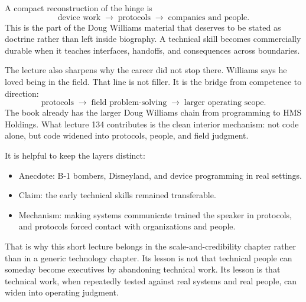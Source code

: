 \documentclass[11pt,oneside]{book}
\begin{document}
A compact reconstruction of the hinge is
\[
\text{device work}
\;\longrightarrow\;
\text{protocols}
\;\longrightarrow\;
\text{companies and people}.
\]
This is the part of the Doug Williams material that deserves to be stated as doctrine rather than left inside biography. A technical skill becomes commercially durable when it teaches interfaces, handoffs, and consequences across boundaries.

The lecture also sharpens why the career did not stop there. Williams says he loved being in the field. That line is not filler. It is the bridge from competence to direction:
\[
\text{protocols}
\;\longrightarrow\;
\text{field problem-solving}
\;\longrightarrow\;
\text{larger operating scope}.
\]
The book already has the larger Doug Williams chain from programming to HMS Holdings. What lecture 134 contributes is the clean interior mechanism: not code alone, but code widened into protocols, people, and field judgment.

It is helpful to keep the layers distinct:
\begin{itemize}
\item Anecdote: B-1 bombers, Disneyland, and device programming in real settings.
\item Claim: the early technical skills remained transferable.
\item Mechanism: making systems communicate trained the speaker in protocols, and protocols forced contact with organizations and people.
\end{itemize}

That is why this short lecture belongs in the scale-and-credibility chapter rather than in a generic technology chapter. Its lesson is not that technical people can someday become executives by abandoning technical work. Its lesson is that technical work, when repeatedly tested against real systems and real people, can widen into operating judgment.
\end{document}
